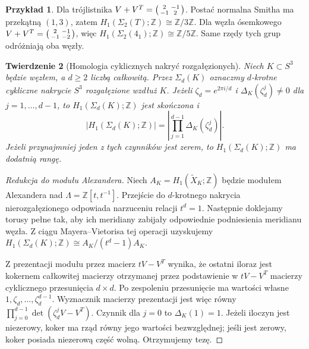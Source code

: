 \documentclass[11pt,a4paper]{report}
\numberwithin{equation}{section}
\theoremstyle{plain}
\newtheorem{twierdzenie}{Twierdzenie}[section]
\theoremstyle{definition}
\newtheorem{przyklad}[twierdzenie]{Przykład}
\theoremstyle{remark}
\begin{document}
\begin{przyklad}
Dla trójlistnika
$V+V^T=\begin{psmallmatrix}2&-1\\-1&2\end{psmallmatrix}$.
Postać normalna Smitha ma przekątną $(1,3)$,
zatem $H_1(\Sigma_2(T);\mathbb Z)\cong\mathbb Z/3\mathbb Z$.
Dla węzła ósemkowego
$V+V^T=\begin{psmallmatrix}2&-1\\-1&-2\end{psmallmatrix}$,
więc $H_1(\Sigma_2(4_1);\mathbb Z)\cong\mathbb Z/5\mathbb Z$.
Same rzędy tych grup odróżniają oba węzły.
\end{przyklad}

\begin{twierdzenie}[Homologia cyklicznych nakryć rozgałęzionych]
Niech $K\subset S^3$ będzie węzłem, a $d\ge2$ liczbą
całkowitą. Przez $\Sigma_d(K)$ oznaczmy $d$-krotne
cykliczne nakrycie $S^3$ rozgałęzione wzdłuż $K$.
Jeżeli $\zeta_d=e^{2\pi i/d}$ i
$\Delta_K(\zeta_d^j)\ne0$ dla $j=1,\dots,d-1$, to
$H_1(\Sigma_d(K);\mathbb Z)$ jest skończona i
\[
|H_1(\Sigma_d(K);\mathbb Z)|=
\left|\prod_{j=1}^{d-1}\Delta_K(\zeta_d^j)\right|.
\]
Jeżeli przynajmniej jeden z tych czynników jest zerem,
to $H_1(\Sigma_d(K);\mathbb Z)$ ma dodatnią rangę.
\end{twierdzenie}

\begin{proof}[Redukcja do modułu Alexandera]
Niech $A_K=H_1(\widetilde X_K;\mathbb Z)$ będzie modułem
Alexandera nad $\Lambda=\mathbb Z[t,t^{-1}]$.
Przejście do $d$-krotnego nakrycia nierozgałęzionego
odpowiada narzuceniu relacji $t^d=1$. Następnie
doklejamy torusy pełne tak, aby ich meridiany zabijały
odpowiednie podniesienia meridianu węzła. Z ciągu
Mayera--Vietorisa tej operacji uzyskujemy
$H_1(\Sigma_d(K);\mathbb Z)\cong A_K/(t^d-1)A_K$.

Z prezentacji modułu przez macierz $tV-V^T$
wynika, że ostatni iloraz jest kokernem całkowitej
macierzy otrzymanej przez podstawienie w $tV-V^T$
macierzy cyklicznego przesunięcia $d\times d$.
Po zespoleniu przesunięcie ma wartości własne
$1,\zeta_d,\dots,\zeta_d^{d-1}$. Wyznacznik
macierzy prezentacji jest więc równy
$\prod_{j=0}^{d-1}\det(\zeta_d^jV-V^T)$.
Czynnik dla $j=0$ to $\Delta_K(1)=1$.
Jeżeli iloczyn jest niezerowy, koker ma rząd równy
jego wartości bezwzględnej; jeśli jest zerowy, koker
posiada niezerową część wolną. Otrzymujemy tezę.
\end{proof}
\end{document}
